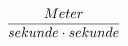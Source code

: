 \documentclass[preview]{standalone}
\begin{document}
\begin{align*}
\special{dvisvgm:raw <g id='unique000'>}\frac{Meter}{sekunde \cdot  sekunde}\special{dvisvgm:raw </g>}
\end{align*}
\end{document}
